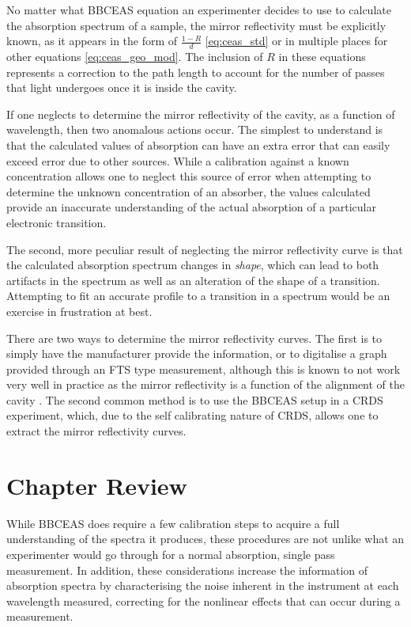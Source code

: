 No matter what \ac{BBCEAS} equation an experimenter decides to use to calculate
the absorption spectrum of a sample, the mirror reflectivity must be explicitly
known, as it appears in the form of $\tfrac{1-R}{d}$ \eqref{eq:ceas_std} or in
multiple places for other equations \eqref{eq:ceas_geo_mod}. The inclusion of
$R$ in these equations represents a correction to the path length to account
for the number of passes that light undergoes once it is inside the cavity.

If one neglects to determine the mirror reflectivity of the cavity, as a
function of wavelength, then two anomalous actions occur. The simplest to
understand is that the calculated values of absorption can have an extra error
that can easily exceed error due to other sources. While a calibration against
a known concentration allows one to neglect this source of error when
attempting to determine the unknown concentration of an absorber, the values
calculated provide an inaccurate understanding of the actual absorption of a
particular electronic transition.

The second, more peculiar result of neglecting the mirror reflectivity curve is
that the calculated absorption spectrum changes in \emph{shape}, which  can
lead to both artifacts in the spectrum as well as an alteration of the shape of
a transition. Attempting to fit an accurate profile to a transition in a
spectrum would be an exercise in frustration at best.

There are two ways to determine the mirror reflectivity curves. The first is
to simply have the manufacturer provide the information, or to digitalise a
graph provided through an \ac{FTS} type measurement, although this is known to
not work very well in practice as the mirror reflectivity is a function of the
alignment of the cavity \cite{Berden:2009wk}. The second common method is to
use the \ac{BBCEAS} setup in a \ac{CRDS} experiment, which, due to the self
calibrating nature of \ac{CRDS}, allows one to extract the mirror reflectivity
curves.



\section*{Chapter Review}

While \ac{BBCEAS} does require a few calibration steps to acquire a full
understanding of the spectra it produces, these procedures are not unlike what
an experimenter would go through for a normal absorption, single pass
measurement. In addition, these considerations increase the information of
absorption spectra by characterising the noise inherent in the instrument at
each wavelength measured, correcting for the nonlinear
effects that can occur during a measurement.

